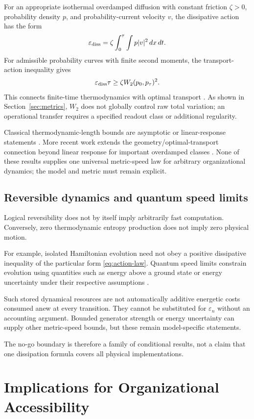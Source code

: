\documentclass[11pt,a4paper]{article}
\theoremstyle{definition}
\numberwithin{equation}{section}
\begin{document}
For an appropriate isothermal overdamped diffusion with constant
friction $\zeta>0$, probability density $p$, and probability-current
velocity $v$, the dissipative action has the form
\[
\varepsilon_{\rm diss}
=
\zeta\int_0^\tau\int p|v|^2\,dx\,dt.
\]
For admissible probability curves with finite second moments,
the transport-action inequality gives
\[
\varepsilon_{\rm diss}\tau
\ge
\zeta W_2(p_0,p_\tau)^2.
\]
This connects finite-time thermodynamics with optimal transport
\cite{Aurell2011}. As shown in Section~\ref{sec:metrics}, $W_2$ does not
globally control raw total variation; an operational transfer requires a
specified readout class or additional regularity.

Classical thermodynamic-length bounds are asymptotic or
linear-response statements \cite{Crooks2007,SivakCrooks2012}. More recent
work extends the geometry/optimal-transport connection beyond linear response
for important overdamped classes \cite{ZhongDeWeese2024}. None of these
results supplies one universal metric-speed law for arbitrary organizational
dynamics; the model and metric must remain explicit.

\subsection*{Reversible dynamics and quantum speed limits}

Logical reversibility does not by itself imply arbitrarily
fast computation. Conversely, zero thermodynamic entropy
production does not imply zero physical motion.

For example, isolated Hamiltonian evolution need not obey a
positive dissipative inequality of the particular form
\eqref{eq:action-law}. Quantum speed limits constrain evolution
using quantities such as energy above a ground state or energy
uncertainty under their respective assumptions
\cite{MargolusLevitin1998}.

Such stored dynamical resources are not automatically additive
energetic costs consumed anew at every transition. They cannot
be substituted for $\varepsilon_n$ without an accounting
argument. Bounded generator strength or energy uncertainty
can supply other metric-speed bounds, but these remain
model-specific statements.

The no-go boundary is therefore a family of conditional results,
not a claim that one dissipation formula covers all physical
implementations.

\section{Implications for Organizational Accessibility}
\end{document}

